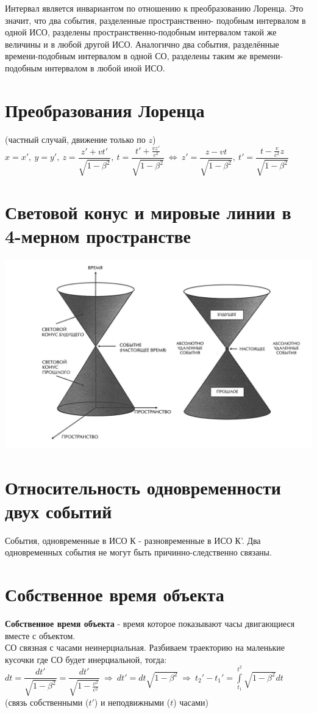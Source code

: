 \begin{multicols*}{2}
		Интервал является инвариантом по отношению к преобразованию Лоренца. Это значит, что два события, разделенные пространственно- подобным интервалом в одной ИСО, разделены пространственно-подобным интервалом такой же величины и в любой другой ИСО. Аналогично два события, разделённые времени-подобным интервалом в одной СО, разделены таким же времени-подобным интервалом в любой иной ИСО.
		
		\section{Преобразования Лоренца}
		
		(частный случай, движение только по $ z $) \\ 
		$ x=x',~ y=y',~ z=\dfrac{z'+vt'}{\sqrt{1-\beta^2}},~ t=\dfrac{t'+\frac{vz'}{c^2}}{\sqrt{1-\beta^2}}~\Leftrightarrow~ z'=\dfrac{z-vt}{\sqrt{1-\beta^2}},~ t'=\dfrac{t-\frac{v}{c^2}z}{\sqrt{1-\beta^2}} $
		
		\section{Световой конус и мировые линии в 4-мерном пространстве}
		\includegraphics[width=0.6\linewidth]{sto_img/lihgt_konus}
		
		\section{Относительность одновременности двух событий}
		
		События, одновременные в ИСО К - разновременные в ИСО К'. Два одновременных события не могут быть причинно-следственно связаны.
		
		\section{Собственное время объекта}
		
		\textbf{Собственное время объекта} - время которое показывают часы двигающиеся вместе с объектом. \\
		СО  связная с часами неинерциальная. Разбиваем траекторию на маленькие кусочки где СО будет инерциальной, тогда: \\
		$ dt=\dfrac{dt'}{\sqrt{1-\beta^2}} = \dfrac{dt'}{\sqrt{1-\frac{v^2}{c^2}}} ~\Rightarrow~ dt'=dt\sqrt{1-\beta^2} ~\Rightarrow~ t_2'-t_1' = \int\limits_{t_1}^{t^2}\sqrt{1-\beta^2} dt$ \\
		(связь собственными ($ t' $) и неподвижными ($ t  $) часами)
		

\end{multicols*}
